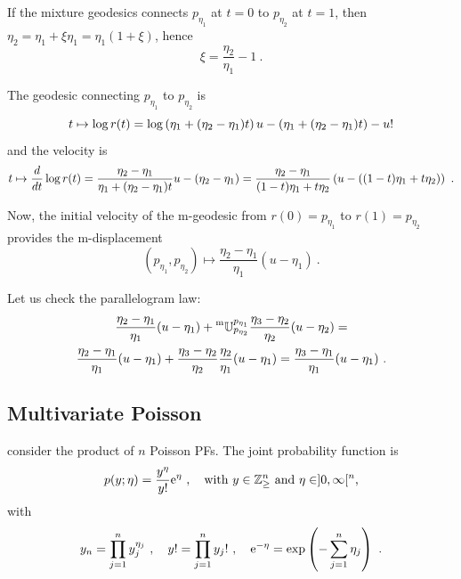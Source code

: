 \documentclass[12pt,a4paper]{amsart}
\begin{document}
If the mixture geodesics connects $p_{\eta_1}$ at $t = 0$ to $p_{\eta_2}$ at $t = 1$, then $\eta_2 = \eta_1 + \xi \eta_1 = \eta_1 (1 + \xi)$, hence
\begin{equation}
    \xi = \frac {\eta_2}{\eta_1} - 1 \ .
\end{equation}

The geodesic connecting $p_{\eta_1}$ to $p_{\eta_2}$ is
\begin{equation}
  \label{eq:24}
t \mapsto \log r(t) = \log\left(\eta_1 + (\eta_2- \eta_1)t\right) u - \left(\eta_1 + (\eta_2-\eta_1) t \right) - u!
\end{equation}
and the velocity is
\begin{equation}
  \label{eq:25}
t \mapsto \frac{d}{dt} \log r(t) = \frac {\eta_2 - \eta_1}{\eta_1 + (\eta_2 - \eta_1)t} u - (\eta_2 - \eta_1) =
\frac {\eta_2 - \eta_1}{(1-t) \eta_1 + t \eta_2} \left(u - ((1-t) \eta_1 + t \eta_2) \right) \ .
\end{equation}

Now, the initial velocity of the m-geodesic from $r(0) = p_{\eta_1}$ to $r(1) = p_{\eta_2}$ provides the m-displacement
\begin{equation}
    (p_{\eta_1}, p_{\eta_2}) \mapsto \frac {\eta_2 - \eta_1}{\eta_1} (u - \eta_1) \ .
    \end{equation}

Let us check the parallelogram law:
\begin{multline}
\frac {\eta_2 - \eta_1}{\eta_1} (u - \eta_1) + \prescript{\text{m}}{} {\mathbb U} _ {p_{\eta_2}} ^ {p_{\eta_1}} \frac {\eta_3 - \eta_2}{\eta_2} (u - \eta_2) = \\
\frac {\eta_2 - \eta_1}{\eta_1} (u - \eta_1) + \frac {\eta_3 - \eta_2}{\eta_2} \frac {\eta_2}{\eta_1} (u - \eta_1) =
\frac {\eta_3 - \eta_1}{\eta_1} (u - \eta_1) \ .\end{multline}
\subsection{Multivariate Poisson}
\label{sec:multivariate-poisson}

consider the product of $n$ Poisson PFs. The joint probability function is
\begin{equation}
    p(y;\eta) = \frac {y^\eta}{y!} \mathrm{e}^{\eta} \ , \quad \text{with $y \in \mathbb{Z}_\ge^n$ and $\eta \in ]0,\infty[^n$,}
\end{equation}
with\begin{equation}
    y_n = \prod_{j=1}^n y_j^{\eta_j}\ , \quad y! = \prod_{j=1}^n y_j! \ ,\quad \mathrm{e}^{-\eta} = \exp\left(- \sum_{j=1}^n \eta_j\right) \ .
\end{equation}
\end{document}
